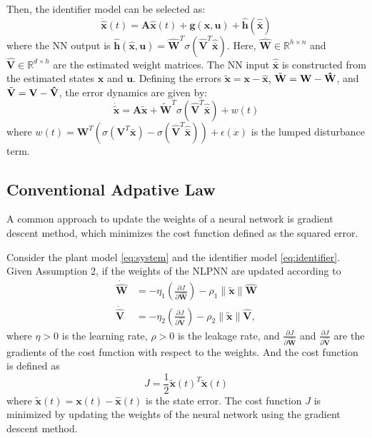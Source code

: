 \documentclass[10pt,twocolumn]{ICCAS}
\newcommand{\R}{\mathbb{R}}
\newcommand{\xtilde}{\tilde{\bm{x}}}
\newcommand{\xhat}{\hat{\bm{x}}}
\newcommand{\xbar}{\bar{\bm{x}}}
\newcommand{\xhatbar}{\hat{\bar{\bm{x}}}}
\newcommand{\Wtilde}{\tilde{\mathbf{W}}}
\newcommand{\What}{\hat{\mathbf{W}}}
\newcommand{\Vtilde}{\tilde{\mathbf{V}}}
\newcommand{\Vhat}{\hat{\mathbf{V}}}
\begin{document}
Then, the identifier model can be selected as:
\begin{equation}
    \dot{\xhat}(t) = {\mathbf{A}}\bm{\xhat}(t) + \bm{g}(\bm{x}, \bm{u}) + \bm{\hat{h}}(\xhatbar)
    \label{eq:identifier}
\end{equation}
where the NN output is $\bm{\hat{h}}(\bm{\hat{x}},\bm{u}) = \What^T \sigma(\Vhat^T \xhatbar)$. Here, $\What \in \R^{h \times n}$ and $\Vhat \in \R^{d \times h}$ are the estimated weight matrices. The NN input $\xhatbar$ is constructed from the estimated states $\xhat$ and $\bm{u}$.
Defining the errors $\xtilde = \bm{x} - \xhat$, $\Wtilde = \bf{W} - \What$, and $\Vtilde = \bf{V} - \Vhat$, the error dynamics are given by:
\begin{equation}
    \dot{\xtilde} = {\mathbf{A}}\bm{\xtilde} + {\Wtilde}^{T} \sigma(\Vhat^T \bm{\xhatbar}) + w(t)
    \label{eq:error_dyn_final}
\end{equation}
where $w(t) = {\mathbf{W}}^T\left(\sigma({\mathbf{V}}^T\bm{\xbar}) - \sigma(\Vhat^T\xhatbar)\right) + \epsilon(x)$ is the lumped disturbance term.

\subsection{Conventional Adpative Law}
A common approach to update the weights of a neural network is gradient descent method, which minimizes the cost function defined as the squared error. 

Consider the plant model \eqref{eq:system} and the identifier model \eqref{eq:identifier}. Given Assumption 2, if the weights of the NLPNN are updated according to
\begin{align}
    \dot{\mathbf{\What}} &= -\eta_1\left(\frac{\partial J}{\partial \hat{\mathbf{W}}}\right) - \rho_1 \|\xtilde\| \What \label{eq:update_W}\\
    \dot{\mathbf{\Vhat}} &= -\eta_2\left(\frac{\partial J}{\partial \hat{\mathbf{V}}}\right) - \rho_2 \|\xtilde\| \Vhat \label{eq:update_V},
\end{align}
where $\eta > 0$ is the learning rate, $\rho > 0$ is the leakage rate, and $\frac{\partial J}{\partial \hat{\mathbf{W}}}$ and $\frac{\partial J}{\partial \hat{\mathbf{V}}}$ are the gradients of the cost function with respect to the weights.
And the cost function is defined as
\begin{equation}
J = \frac{1}{2} {\xtilde(t)}^T \xtilde(t)
\end{equation}
where $\xtilde(t) = \bm{x}(t) - \xhat(t)$ is the state error. The cost function $J$ is minimized by updating the weights of the neural network using the gradient descent method.
\end{document}
